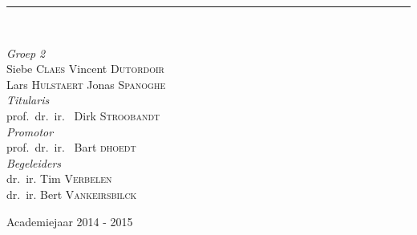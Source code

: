 \documentclass[a4paper,11.5pt]{report}
\newcommand{\HRule}{\rule{\linewidth}{0.5mm}}
\begin{document}
\begin{titlepage}
\begin{center}
\begin{figure}[H]
\end{figure}


\HRule \\[1.5cm]

\begin{minipage}{1\textwidth}
\begin{center} \large
\emph{Groep 2}\\
Siebe \textsc{Claes} 
Vincent \textsc{Dutordoir}\\
Lars \textsc{Hulstaert}
Jonas \textsc{Spanoghe}\\[0.2cm]
\emph{Titularis}\\
prof.~dr.~ir.~ Dirk \textsc{Stroobandt}\\[0.2cm]
\emph{Promotor}\\
prof.~dr.~ir.~ Bart \textsc{dhoedt}\\[0.2cm]
\emph{Begeleiders}\\
dr.~ir. Tim \textsc{Verbelen}\\
dr.~ir. Bert \textsc{Vankeirsbilck}\\

\end{center}
\end{minipage}

\vfill

{\large Academiejaar 2014 - 2015}
\end{center}

\end{titlepage}

\tableofcontents

% 








\end{document}
